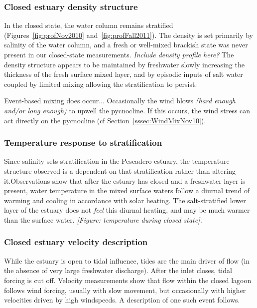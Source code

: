 \subsubsection{Closed estuary density structure} \label{cl_strat}


In the closed state, the water column remains stratified (Figures~\ref{fig:profNov2010} and~\ref{fig:profFall2011}). The density is set primarily by salinity of the water column, and a fresh or well-mixed brackish state was never present in our closed-state measurements. \emph{Include density profile here?} The density structure appears to be maintained by freshwater slowly increasing the thickness of the fresh surface mixed layer, and by episodic inputs of salt water coupled by limited mixing allowing the stratification to persist. 

Event-based mixing does occur...  Occasionally the wind blows \emph{(hard enough and/or long enough)} to upwell the pycnocline. If this occurs, the wind stress can act directly on the pycnocline (cf Section~\ref{sssec:WindMixNov10}).

\subsubsection{Temperature response to stratification} \label{sssec:TempResStrat}

Since salinity sets stratification in the Pescadero estuary, the temperature structure observed is a dependent on that stratification rather than altering it.Observations show that after the estuary has closed and a freshwater layer is present, water temperature in the mixed surface waters follow a diurnal trend of warming and cooling in accordance with solar heating. The salt-stratified lower layer of the estuary does not \emph{feel} this diurnal heating, and may be much warmer than the surface water. \emph{[Figure: temperature during closed state].}

\subsubsection{Closed estuary velocity description} \label{cl_vel}
While the estuary is open to tidal influence, tides are the main driver of flow (in the absence of very large freshwater discharge). After the inlet closes, tidal forcing is cut off. Velocity measurements show that flow within the closed lagoon follows wind forcing, usually with slow movement, but occasionally with higher velocities driven by high windspeeds. A description of one such event follows.

